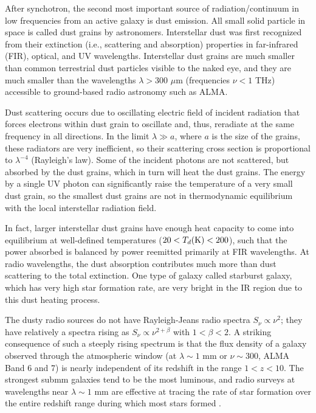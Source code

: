 After synchotron, the second most important source of radiation/continuum in low frequencies from an active galaxy is dust emission. All small solid particle in space is called dust grains by astronomers. Interstellar dust was first recognized from their extinction (i.e., scattering and absorption) properties in far-infrared (FIR), optical, and UV wavelengths. Interstellar dust grains are much smaller than common terrestrial dust particles visible to the naked eye, and they are much smaller than the wavelengths $\lambda > 300$ $\mu$m (frequencies $\nu < 1$ THz) accessible to ground-based radio astronomy such as ALMA.

Dust scattering occurs due to oscillating electric field of incident radiation that forces electrons within dust grain to oscillate and, thus, reradiate at the same frequency in all directions.  In the limit $\lambda \gg a$, where $a$ is the size of the grains, these radiators are very inefficient, so their scattering cross section is proportional to $\lambda^{-4}$ (Rayleigh's law). Some of the incident photons are not scattered, but absorbed by the dust grains, which in turn will heat the dust grains. The energy by a single UV photon can significantly raise the temperature of a very small dust grain, so the smallest dust grains are not in thermodynamic equilibrium with the local interstellar radiation field. 

In fact, larger interstellar dust grains have enough heat capacity to come into equilibrium at well-defined temperatures ($20 < T_d({\rm K})<200$), such that the power absorbed is balanced by power reemitted primarily at  FIR wavelengths. At radio wavelengths, the dust absorption contributes much more than dust scattering to the total extinction. One type of galaxy called starburst galaxy, which has very high star formation rate, are very bright in the IR region due to this dust heating process.


The dusty radio sources do not have Rayleigh-Jeans radio spectra $S_\nu \varpropto \nu^{2}$; they have relatively a spectra rising as $S_\nu \varpropto \nu^{2 + \beta}$ with $1 < \beta < 2$. A striking consequence of such a steeply rising spectrum is that the flux density of a galaxy observed through the atmospheric window (at $\lambda \sim 1$ mm or $\nu \sim 300$, ALMA Band 6 and 7) is nearly independent of its redshift in the range $1 < z < 10$. The strongest submm galaxies tend to be the most luminous, and radio surveys at wavelengths near $\lambda \sim 1$ mm are effective at tracing the rate of star formation over the entire redshift range during which most stars formed \citep[e.g.,][]{blain1993}.

